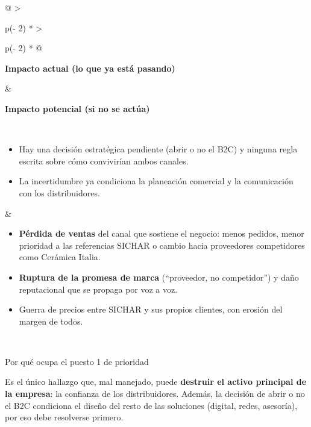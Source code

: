 \documentclass[11pt,a4paper]{article}
\begin{document}
\begin{longtable}[]{@{}
  >{\raggedright\arraybackslash}p{(\columnwidth - 2\tabcolsep) * }
  >{\raggedright\arraybackslash}p{(\columnwidth - 2\tabcolsep) * }@{}}
\toprule\noalign{}
\begin{minipage}[b]{\linewidth}\raggedright
\textbf{Impacto actual (lo que ya está pasando)}
\end{minipage} & \begin{minipage}[b]{\linewidth}\raggedright
\textbf{Impacto potencial (si no se actúa)}
\end{minipage} \\
\midrule\noalign{}
\endfirsthead
\bottomrule\noalign{}
\endlastfoot
\begin{minipage}[t]{\linewidth}\raggedright
\begin{itemize}
\item
  Hay una decisión estratégica pendiente (abrir o no el B2C) y ninguna regla escrita sobre cómo
  convivirían ambos canales.
\item
  La incertidumbre ya condiciona la planeación comercial y la comunicación con los distribuidores.
\end{itemize}
\end{minipage} & \begin{minipage}[t]{\linewidth}\raggedright
\begin{itemize}
\item
  \textbf{Pérdida de ventas} del canal que sostiene el negocio: menos pedidos, menor prioridad a las
  referencias SICHAR o cambio hacia proveedores competidores como Cerámica Italia.
\item
  \textbf{Ruptura de la promesa de marca} (``proveedor, no competidor'') y daño reputacional que se
  propaga por voz a voz.
\item
  Guerra de precios entre SICHAR y sus propios clientes, con erosión del margen de todos.
\end{itemize}
\end{minipage} \\
\end{longtable}

\begin{cajaaviso}{Por qué ocupa el puesto 1 de prioridad}

Es el único hallazgo que, mal manejado, puede \textbf{destruir el activo principal de la empresa}:
la confianza de los distribuidores. Además, la decisión de abrir o no el B2C condiciona el diseño
del resto de las soluciones (digital, redes, asesoría), por eso debe resolverse primero.

\end{cajaaviso}
\end{document}

